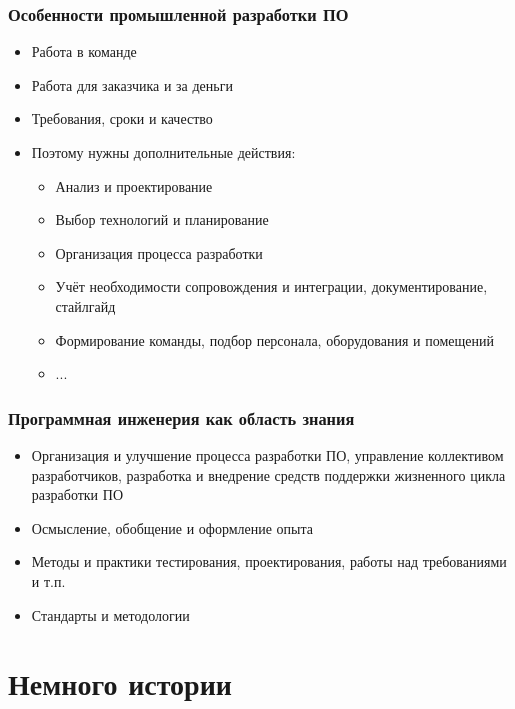 \documentclass{../../slides-style}
\begin{document}
    \begin{frame}
        \frametitle{Особенности промышленной разработки ПО}
        \begin{itemize}
            \item Работа в команде
            \item Работа для заказчика и за деньги
            \item Требования, сроки и качество
            \item Поэтому нужны дополнительные действия:
            \begin{itemize}
                \item Анализ и проектирование
                \item Выбор технологий и планирование
                \item Организация процесса разработки
                \item Учёт необходимости сопровождения и интеграции, документирование, стайлгайд
                \item Формирование команды, подбор персонала, оборудования и помещений
                \item ...
            \end{itemize}
        \end{itemize}
    \end{frame}

    \begin{frame}
        \frametitle{Программная инженерия как область знания}
        \begin{itemize}
            \item Организация и улучшение процесса разработки ПО, управление коллективом разработчиков, разработка и внедрение средств поддержки жизненного цикла разработки ПО
            \item Осмысление, обобщение и оформление опыта
            \item Методы и практики тестирования, проектирования, работы над требованиями и т.п.
            \item Стандарты и методологии
        \end{itemize}
    \end{frame}

    \section{Немного истории}
\end{document}
